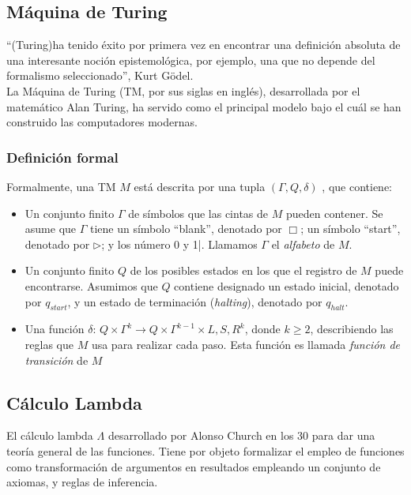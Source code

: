 \subsection{Máquina de Turing}

``(Turing)ha tenido éxito por primera vez en encontrar una definición absoluta de una interesante noción epistemológica, por ejemplo, una que no depende del formalismo seleccionado'', Kurt Gödel. \\

La Máquina de Turing (TM, por sus siglas en inglés), desarrollada por el matemático Alan Turing, ha servido como el principal modelo bajo el cuál se han construido las computadores modernas.

\subsubsection{Definición formal}

Formalmente, una TM $M$ está descrita por una tupla $(\Gamma, Q, \delta)$  \cite{Arora2009}, que contiene:

\begin{itemize}
\item Un conjunto finito $\Gamma$ de símbolos que las cintas de $M$ pueden contener. Se asume que $\Gamma$ tiene un símbolo ``blank'', denotado por $\Box$; un símbolo ``start'', denotado por $\rhd$; y los número 0 y 1|. Llamamos $\Gamma$ el \emph{alfabeto} de $M$.

\item Un conjunto finito $Q$ de los posibles estados en los que el registro de $M$ puede encontrarse. Asumimos que $Q$ contiene designado un estado inicial, denotado por $q_{start}$, y un estado de terminación (\emph{halting}), denotado por $q_{halt}$.

\item Una función $\delta$: $Q \times \Gamma^k \to Q \times \Gamma^{k-1} \times {L,S,R}^k$, donde $k \geq 2$, describiendo las reglas que $M$ usa para realizar cada paso. Esta función es llamada \emph{función de transición} de $M$
\end{itemize}

\subsection{Cálculo Lambda}

El cálculo lambda $\Lambda$ desarrollado por Alonso Church en los 30 para dar una teoría general de las funciones. Tiene por objeto formalizar el empleo de funciones como transformación de argumentos en resultados empleando 
un conjunto de axiomas, y reglas de inferencia.

